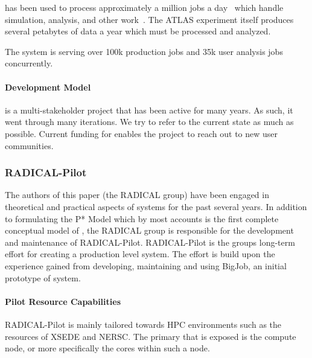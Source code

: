 \documentclass{sig-alternate}
\begin{document}
\panda has been used to process approximately a million jobs a
day~\cite{pandapresentation2013-06} which handle simulation, analysis, and
other work~\cite{maeno_pd2p:_2012}. The ATLAS experiment itself produces
several petabytes of data a year which must be processed and analyzed.

The \panda system is serving over 100k production jobs and 35k user analysis
jobs concurrently.


\paragraph{Development Model}

\panda is a multi-stakeholder project that has been active for many years. As
such, it went through many iterations. We try to refer to the current state as
much as possible.
Current funding for \panda enables the project to reach out to new user
communities.


%
%
\subsubsection{RADICAL-Pilot}
\label{sec:radicalpilot}

The authors of this paper (the RADICAL group) have been engaged in theoretical
and practical aspects of \pilot systems for the past several years. In addition
to formulating the P* Model\cite{} which by most accounts is the first complete
conceptual model of \pilots, the RADICAL group is responsible for the
development and maintenance of RADICAL-Pilot\cite{}. RADICAL-Pilot is the
groups long-term effort for creating a production level \pilot system. The
effort is build upon the experience gained from developing, maintaining and
using BigJob\cite{}, an initial prototype of \pilot system.

\paragraph{Pilot Resource Capabilities}

RADICAL-Pilot is mainly tailored towards HPC environments such as the resources
of XSEDE and NERSC\cite{}. The primary  that is exposed is the
compute node, or more specifically the cores within such a node.
\end{document}
